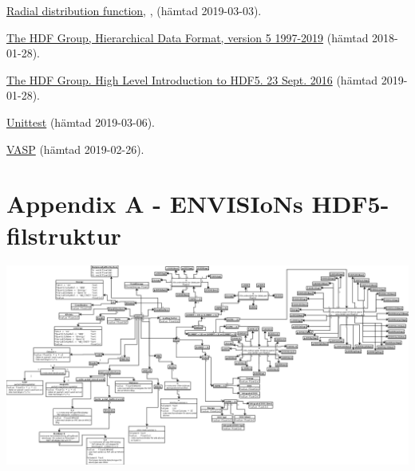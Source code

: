 \documentclass[10pt,oneside,swedish]{article}
\begin{document}
\begin{thebibliography}{9}
  \href{https://en.wikipedia.org/wiki/Radial\distribution\function}{Radial distribution function}, , (hämtad 2019-03-03).

 \href{https://support.hdfgroup.org/HDF5/}{The HDF Group, Hierarchical Data Format, version 5 1997-2019} (hämtad 2018-01-28).

  \href{https://support.hdfgroup.org/HDF5/Tutor/HDF5Intro.pdf}{The HDF Group. High Level Introduction to HDF5. 23 Sept. 2016} (hämtad 2019-01-28).

  \href{https://docs.python.org/3/library/unittest.html}{Unittest} (hämtad 2019-03-06).

  \href{https://www.vasp.at/index.php/about-vasp/59-about-vasp}{VASP} (hämtad 2019-02-26).


\end{thebibliography}


\newpage
\section{Appendix A - ENVISIoNs
HDF5-filstruktur}\label{appendix-a---envisions-hdf5-filstruktur}

\includegraphics[width=1.00000\textwidth]{Images/UPDATE-hdf5-dataformat3modi.png}
\end{document}
